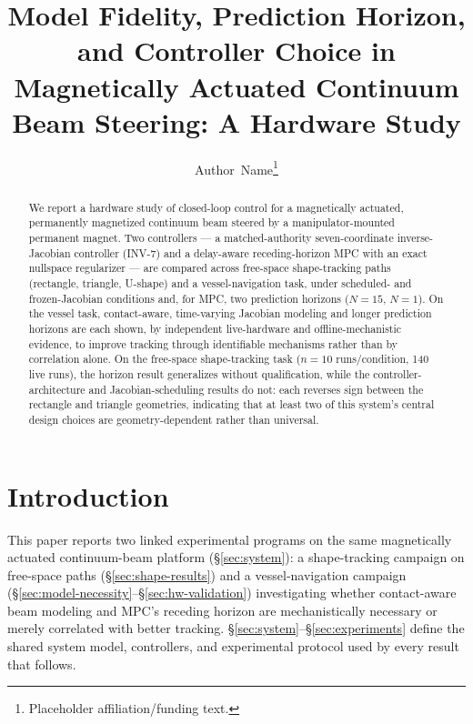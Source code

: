 \documentclass[journal]{IEEEtran}
\begin{document}
\title{Model Fidelity, Prediction Horizon, and Controller Choice in
Magnetically Actuated Continuum Beam Steering: A Hardware Study}

\author{Author~Name\thanks{Placeholder affiliation/funding text.}}

\maketitle

\begin{abstract}
We report a hardware study of closed-loop control for a magnetically
actuated, permanently magnetized continuum beam steered by a
manipulator-mounted permanent magnet. Two controllers --- a
matched-authority seven-coordinate inverse-Jacobian controller (INV-7)
and a delay-aware receding-horizon MPC with an exact nullspace
regularizer --- are compared across free-space shape-tracking paths
(rectangle, triangle, U-shape) and a vessel-navigation task, under
scheduled- and frozen-Jacobian conditions and, for MPC, two prediction
horizons ($N{=}15$, $N{=}1$). On the vessel task, contact-aware,
time-varying Jacobian modeling and longer prediction horizons are each
shown, by independent live-hardware and offline-mechanistic evidence, to
improve tracking through identifiable mechanisms rather than by
correlation alone. On the free-space shape-tracking task
($n{=}10$ runs/condition, 140 live runs), the horizon result generalizes
without qualification, while the controller-architecture and
Jacobian-scheduling results do not: each reverses sign between the
rectangle and triangle geometries, indicating that at least two of this
system's central design choices are geometry-dependent rather than
universal.
\end{abstract}

\section{Introduction}
\label{sec:intro}
This paper reports two linked experimental programs on the same
magnetically actuated continuum-beam platform (\S\ref{sec:system}):
a shape-tracking campaign on free-space paths (\S\ref{sec:shape-results})
and a vessel-navigation campaign (\S\ref{sec:model-necessity}--\S\ref{sec:hw-validation})
investigating whether contact-aware beam modeling and MPC's receding
horizon are mechanistically necessary or merely correlated with better
tracking. \S\ref{sec:system}--\S\ref{sec:experiments} define the shared
system model, controllers, and experimental protocol used by every
result that follows.
\end{document}
